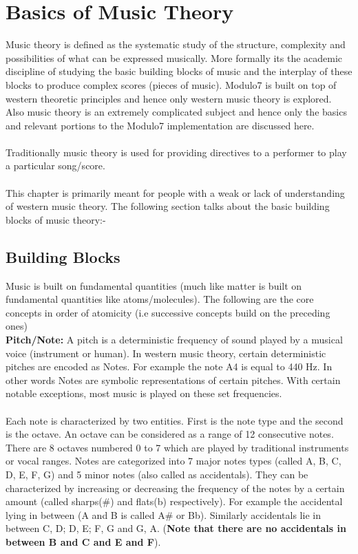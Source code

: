 \chapter{Basics of Music Theory}
\label{sec:music theory}

\noindent Music theory is defined as the systematic study of the structure, complexity and possibilities of what can be expressed musically. More formally its the academic discipline of studying the basic building blocks of music and the interplay of these blocks to produce complex scores (pieces of music). Modulo7 is built on top of western theoretic principles and hence only western music theory is explored. Also music theory is an extremely complicated subject and hence only the basics and relevant portions to the Modulo7 implementation are discussed here. \\\\
Traditionally music theory is used for providing directives to a performer to play a particular song/score. \\\\
This chapter is primarily meant for people with a weak or lack of understanding of western music theory. 
The following section talks about the basic building blocks of music theory:-
\section{Building Blocks}

\noindent Music is built on fundamental quantities (much like matter is built on fundamental quantities like atoms/molecules). The following are the core concepts in order of atomicity (i.e successive concepts build on the preceding ones)\\

\noindent \textbf{Pitch/Note: } A pitch is a deterministic frequency of sound played by a musical voice (instrument or human). In western music theory, certain deterministic pitches are encoded as Notes. For example the note A4 is equal to 440 Hz. In other words Notes are symbolic representations of certain pitches. With certain notable exceptions, most music is played on these set frequencies. \\\\
Each note is characterized by two entities. First is the note type and the second is the octave. An octave can be considered as a range of 12 consecutive notes. There are 8 octaves numbered 0 to 7 which are played by traditional instruments or vocal ranges. Notes are categorized into 7 major notes types (called A, B, C, D, E, F, G) and 5 minor notes (also called as accidentals). They can be characterized by increasing or decreasing the frequency of the notes by a certain amount (called sharps(\#) and flats(b) respectively). For example the accidental lying in between (A and B is called A\# or Bb). Similarly accidentals lie in between C, D; D, E; F, G and G, A. (\textbf{Note that there are no accidentals in between B and C and E and F}). \\

